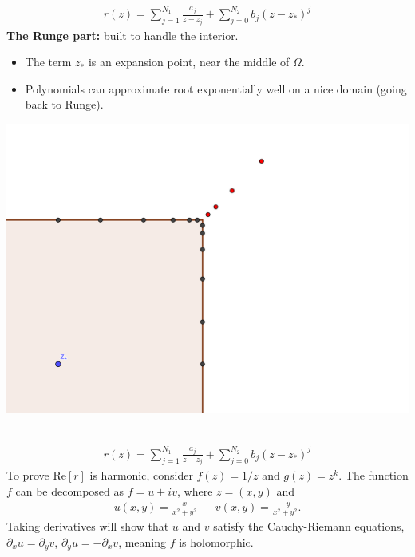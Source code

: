 \documentclass{seminar}
\begin{document}
\begin{slide} %
{} \small \\
\begin{align*}
r(z)= \sum_{j=1}^{N_1} \frac{a_j}{z-z_j} + \sum_{j=0}^{N_2} b_j (z-z_*)^j
\end{align*}
\textbf{The Runge part:} built to handle the interior.
\begin{multicols}{2}
\begin{itemize}
	\item The term $z_*$ is an expansion point, near the middle of $\Omega$.
	\item Polynomials can approximate root exponentially well on a nice domain (going back to Runge).
\end{itemize}
\includegraphics[scale=4]{./PNG/corner_nodes_illust}
\end{multicols}
\end{slide} %




\begin{slide} %
{} \small \\
\begin{align*}
r(z)= \sum_{j=1}^{N_1} \frac{a_j}{z-z_j} + \sum_{j=0}^{N_2} b_j (z-z_*)^j
\end{align*}
To prove $\mathrm{Re}[r]$ is harmonic, consider $f(z)=1/z$ and $g(z)=z^k$.
The function $f$ can be decomposed as $f=u+iv$, where $z=(x,y)$ and
\begin{align*}
u(x,y)=\frac{x}{x^2+y^2} &&
v(x,y)=\frac{-y}{x^2+y^2}.
\end{align*}
Taking derivatives will show that $u$ and $v$ satisfy the Cauchy-Riemann equations, ${\partial}_x u={\partial}_y v$, ${\partial}_y u=-{\partial}_x v$, meaning $f$ is holomorphic.
\end{slide} %
\end{document}
